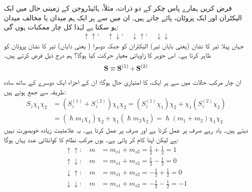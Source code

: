 فرض کریں ہمارے پاس  چکر کے دو ذرات، مثلاً، ہائیڈروجن کے زمینی حال میں ایک الیکٹران اور ایک پروٹان، پائے جاتے ہیں۔ ان میں سے ہر ایک ہم میدان یا مخالف میدان ہو سکتا ہے لہٰذا کل چار ممکنات ہوں گی:
\begin{align}
\uparrow \uparrow, \quad \uparrow \downarrow, \quad \downarrow \uparrow, \quad \downarrow \downarrow
\end{align}
جہاں پہلا تیر کا نشان (یعنی بایاں تیر) الیکٹران کو جبکہ دوسرا ( یعنی دایاں) تیر کا نشان پروٹان کو ظاہر کرتا ہے۔  اس جوہر کا  زاویائی معیار حرکت کیا ہوگا؟ ہم درج ذیل فرض کرتے ہیں۔ 
\begin{align} 
\operatorname{\mathbf{S}} \equiv \operatorname{\mathbf{S}}^{(1)} + \operatorname{\mathbf{S}}^{(2)}
\end{align}
ان چار مرکب حالات میں سے ہر ایک،  کا امتیازی حال ہوگا؛ ان کے  اجزاء ایک دوسرے کے ساتھ سادہ طریقہ سے جمع ہوتے ہیں:
\begin{align*}
S_z \chi_1 \chi_2 &= (S_z^{(1)} + S_z^{(2)} ) \chi_1 \chi_2 = (S_z^{(1)} \chi_1) \chi_2 + \chi_1 (S_z^{(2)} \chi_2) \\
&= (\hslash m_1 \chi_1) \chi_2 + \chi_1 (\hslash m_2 \chi_2) = \hslash (m_1 + m_2) \chi_1 \chi_2
\end{align*}
 دیتے ہیں۔ یاد رہے  صرف  پر عمل کرتا ہے اور  صرف  پر عمل کرتا ہے۔ یہ علامتیت زیادہ خوبصورت نہیں ہے لیکن اپنا کام کر پاتی ہے۔ یوں مرکب نظام کا کوانٹائی عدد  یہاں  ہوگا:
\begin{align*}
\uparrow \uparrow: \quad m &= m_{s1} + m_{s2} = \frac{1}{2} + \frac{1}{2} = 1 \\
\uparrow \downarrow: \quad m &= m_{s1} + m_{s2} = \frac{1}{2} -\frac{1}{2} = 0 \\
\downarrow \uparrow: \quad m &= m_{s1} + m_{s2} = -\frac{1}{2} + \frac{1}{2} = 0 \\
\downarrow \downarrow: \quad m &= m_{s1} + m_{s2} = -\frac{1}{2} - \frac{1}{2} = -1 
\end{align*} 

